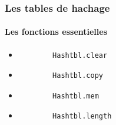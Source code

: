 \begin{frame}[fragile]
\frametitle{Les tables de hachage}
\framesubtitle{Les fonctions essentielles}
	\begin{itemize}
	
	\item
		\begin{lstlisting}
		Hashtbl.clear
		\end{lstlisting}

	\item
		\begin{lstlisting}
		Hashtbl.copy
		\end{lstlisting}	

	\item
		\begin{lstlisting}
		Hashtbl.mem
		\end{lstlisting}	

	\item
		\begin{lstlisting}
		Hashtbl.length
		\end{lstlisting}

	\end{itemize}

\end{frame}

